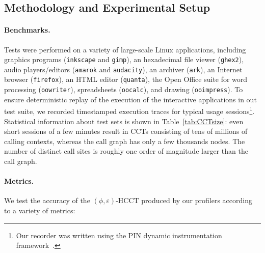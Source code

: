 \documentclass[preprint]{sigplanconf}
\begin{document}
\subsection{Methodology and Experimental Setup}
\label{ss:methodology}


\paragraph{Benchmarks.}  Tests were performed on a variety of large-scale Linux applications, including graphics programs ({\tt inkscape} and {\tt gimp}), an hexadecimal file viewer ({\tt ghex2}), audio players/editors ({\tt amarok} and {\tt audacity}), an archiver ({\tt ark}), an Internet browser ({\tt firefox}), an HTML editor ({\tt quanta}), the Open Office suite for word processing ({\tt oowriter}), spreadsheets ({\tt oocalc}), and drawing ({\tt ooimpress}). To ensure deterministic replay of the execution of the interactive applications in out test suite, we recorded timestamped execution traces for typical usage sessions\footnote{Our recorder was written using the PIN dynamic instrumentation framework~\cite{Pin05}.}. Statistical information about test sets is shown in Table~\ref{tab:CCTsize}: even short sessions of a few minutes result in CCTs consisting of tens of millions of calling contexts, whereas the call graph has only a few thousands nodes. The number of distinct call sites is roughly one order of magnitude larger than the call graph. 

\paragraph{Metrics.} We test the accuracy of the $(\phi,\varepsilon)$-HCCT produced by our profilers according to a variety of metrics:
\end{document}
